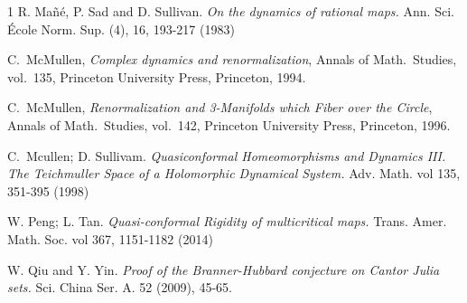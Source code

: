 \documentclass{amsart}
\numberwithin{equation}{section}
\theoremstyle{definition}
\theoremstyle{remark}
\begin{document}
\begin{thebibliography}{1}
 R. Ma\~n\'e, P. Sad and D. Sullivan. {\em On the dynamics of rational maps.} Ann. Sci. \'Ecole Norm. Sup. (4), 16, 193-217 (1983)
    

 C.\ McMullen, {\em Complex dynamics and renormalization},  Annals of Math.\ Studies, vol.\ 135, Princeton University Press, Princeton, 1994.


 C.\ McMullen, {\em Renormalization and 3-Manifolds which Fiber over the Circle}, Annals of Math.\ Studies, vol.\ 142, Princeton University Press, Princeton, 1996.

 C.\ Mcullen; D. Sullivam. {\em Quasiconformal Homeomorphisms and Dynamics III. The Teichmuller Space of a Holomorphic Dynamical System.} Adv. Math. vol 135, 351-395 (1998)

 W. Peng; L. Tan. {\em Quasi-conformal Rigidity of multicritical maps.}
Trans. Amer. Math. Soc. vol 367, 1151-1182 (2014)

 W. Qiu and Y. Yin. {\em Proof of the {B}ranner-{H}ubbard conjecture on {C}antor {J}ulia sets.} Sci. China Ser. A. 52 (2009), 45-65.
    

\end{thebibliography}
\end{document}
